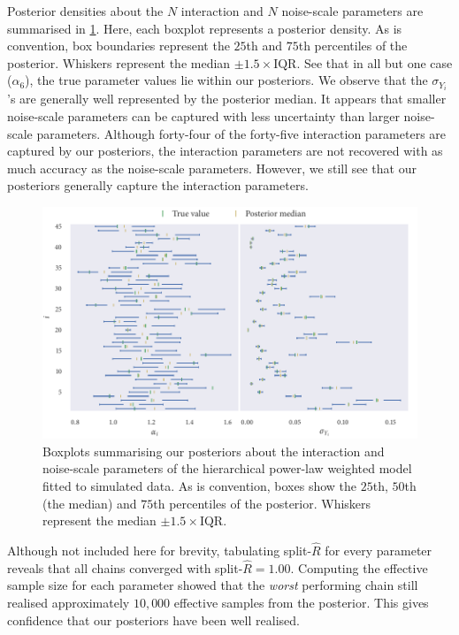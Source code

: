Posterior densities about the $N$ interaction and $N$ noise-scale parameters are
summarised in \cref{fig:power_hier_summary}. Here, each boxplot represents a
posterior density. As is convention, box boundaries represent the $25$th and
$75$th percentiles of the posterior. Whiskers represent the median
$\pm1.5\times\text{IQR}$. See that in all but one case ($\alpha_6$), the true
parameter values lie within our posteriors. We observe that the
$\sigma_{Y_i}$'s are generally well represented by the posterior median. It
appears that smaller noise-scale parameters can be captured with less
uncertainty than larger noise-scale parameters. Although forty-four of the
forty-five interaction parameters are captured by our posteriors, the
interaction parameters are not recovered with as much accuracy as the
noise-scale parameters. However, we still see that our posteriors generally
capture the interaction parameters. 

\begin{figure}[tbp]
  \includegraphics{power_hier_summary.pdf}
  \caption{Boxplots summarising our posteriors about the interaction and
    noise-scale parameters of the hierarchical power-law weighted model
    fitted to simulated data. As is convention, boxes show the $25$th, $50$th
    (the median) and $75$th percentiles of the posterior. Whiskers represent
    the median $\pm 1.5\times\text{IQR}$.}
  \label{fig:power_hier_summary}
\end{figure}

Although not included here for brevity, tabulating split-$\widehat{R}$ for
every parameter reveals that all chains converged with
split-$\widehat{R}=1.00$. Computing the effective sample size for each
parameter showed that the \emph{worst} performing chain still realised
approximately $10,000$ effective samples from the posterior. This gives
confidence that our posteriors have been well realised.

